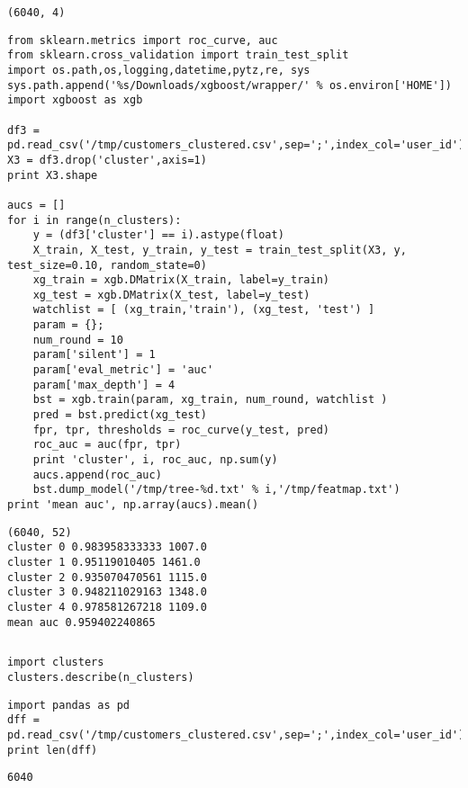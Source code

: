 \documentclass[12pt,fleqn]{article}\usepackage{../common}
\begin{document}
\begin{verbatim}
(6040, 4)
\end{verbatim}

\begin{verbatim}
from sklearn.metrics import roc_curve, auc
from sklearn.cross_validation import train_test_split
import os.path,os,logging,datetime,pytz,re, sys
sys.path.append('%s/Downloads/xgboost/wrapper/' % os.environ['HOME'])
import xgboost as xgb

df3 = pd.read_csv('/tmp/customers_clustered.csv',sep=';',index_col='user_id')
X3 = df3.drop('cluster',axis=1)
print X3.shape

aucs = []
for i in range(n_clusters):
    y = (df3['cluster'] == i).astype(float)    
    X_train, X_test, y_train, y_test = train_test_split(X3, y, test_size=0.10, random_state=0)
    xg_train = xgb.DMatrix(X_train, label=y_train)
    xg_test = xgb.DMatrix(X_test, label=y_test)    
    watchlist = [ (xg_train,'train'), (xg_test, 'test') ]    
    param = {}; 
    num_round = 10
    param['silent'] = 1
    param['eval_metric'] = 'auc'
    param['max_depth'] = 4
    bst = xgb.train(param, xg_train, num_round, watchlist )
    pred = bst.predict(xg_test)
    fpr, tpr, thresholds = roc_curve(y_test, pred)
    roc_auc = auc(fpr, tpr)
    print 'cluster', i, roc_auc, np.sum(y)
    aucs.append(roc_auc)
    bst.dump_model('/tmp/tree-%d.txt' % i,'/tmp/featmap.txt')
print 'mean auc', np.array(aucs).mean()
\end{verbatim}

\begin{verbatim}
(6040, 52)
cluster 0 0.983958333333 1007.0
cluster 1 0.95119010405 1461.0
cluster 2 0.935070470561 1115.0
cluster 3 0.948211029163 1348.0
cluster 4 0.978581267218 1109.0
mean auc 0.959402240865
\end{verbatim}

\inputminted[fontsize=\footnotesize]{python}{clusters.py}

\begin{verbatim}
import clusters
clusters.describe(n_clusters)
\end{verbatim}

\begin{verbatim}
import pandas as pd
dff = pd.read_csv('/tmp/customers_clustered.csv',sep=';',index_col='user_id')
print len(dff)
\end{verbatim}

\begin{verbatim}
6040
\end{verbatim}
\end{document}
